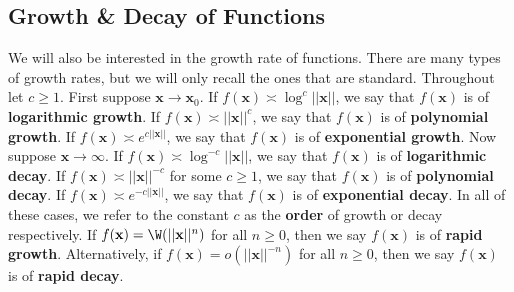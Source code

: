     \subsection*{Growth \& Decay of Functions}
      We will also be interested in the growth rate of functions. There are many types of growth rates, but we will only recall the ones that are standard. Throughout let $c \ge 1$. First suppose $\mathbf{x} \to \mathbf{x}_{0}$. If $f(\mathbf{x}) \asymp \log^{c}||\mathbf{x}||$, we say that $f(\mathbf{x})$ is of \textbf{logarithmic growth}. If $f(\mathbf{x}) \asymp ||\mathbf{x}||^{c}$, we say that $f(\mathbf{x})$ is of \textbf{polynomial growth}. If $f(\mathbf{x}) \asymp e^{c||\mathbf{x}||}$, we say that $f(\mathbf{x})$ is of \textbf{exponential growth}. Now suppose $\mathbf{x} \to \infty$. If $f(\mathbf{x}) \asymp \log^{-c}||\mathbf{x}||$, we say that $f(\mathbf{x})$ is of \textbf{logarithmic decay}. If $f(\mathbf{x}) \asymp ||\mathbf{x}||^{-c}$ for some $c \ge 1$, we say that $f(\mathbf{x})$ is of \textbf{polynomial decay}. If $f(\mathbf{x}) \asymp e^{-c||\mathbf{x}||}$, we say that $f(\mathbf{x})$ is of \textbf{exponential decay}. In all of these cases, we refer to the constant $c$ as the \textbf{order} of growth or decay respectively. If $f(\mathbf{x}) = \W(||\mathbf{x}||^{n})$ for all $n \ge 0$, then we say $f(\mathbf{x})$ is of \textbf{rapid growth}. Alternatively, if $f(\mathbf{x}) = o(||\mathbf{x}||^{-n})$ for all $n \ge 0$, then we say $f(\mathbf{x})$ is of \textbf{rapid decay}.
